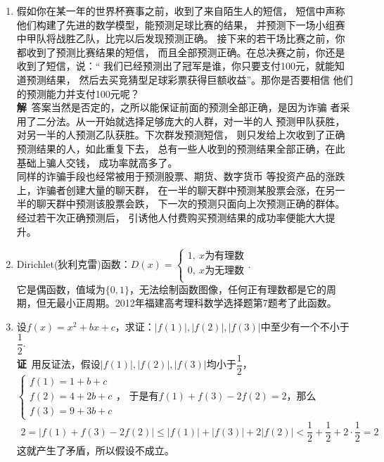\begin{enumerate}[label={【\textbf{例\thechapter.\arabic*}】},
 leftmargin=\inteval{\myenumleftmargin}pt,
 itemsep=\inteval{\myenumitempsep}pt,
 itemindent=\inteval{\myenumitemindent}pt]
 
\item \label{用二分法预测比赛结果进行诈骗}
假如你在某一年的世界杯赛事之前，收到了来自陌生人的短信，
短信中声称他们构建了先进的数学模型，能预测足球比赛的结果，
并预测下一场小组赛中甲队将战胜乙队，比完以后发现预测正确。
接下来的若干场比赛之前，你都收到了预测比赛结果的短信，
而且全部预测正确。在总决赛之前，你还是收到了短信，说：“
我们已经预测出了冠军是谁，你只要支付100元，就能知道预测结果，
然后去买竞猜型足球彩票获得巨额收益”。那你是否要相信
他们的预测能力并支付100元呢？ \\
\textbf{解}\ 答案当然是否定的，之所以能保证前面的预测全部正确，是因为诈骗
者采用了二分法。从一开始就选择足够庞大的人群，对一半的人
预测甲队获胜，对另一半的人预测乙队获胜。下次群发预测短信，
则只发给上次收到了正确预测结果的人，如此重复下去，
总有一些人收到的预测结果全部正确，在此基础上骗人交钱，
成功率就高多了。\\
同样的诈骗手段也经常被用于预测股票、期货、数字货币
等投资产品的涨跌上，诈骗者创建大量的聊天群，
在一半的聊天群中预测某股票会涨，在另一半的聊天群中预测该股票会跌，
下一次的预测只面向上次预测正确的群体。经过若干次正确预测后，
引诱他人付费购买预测结果的成功率便能大大提升。

\item Dirichlet(狄利克雷)函数：$ D(x)=
\begin{cases}
    1,\ x\text{为有理数} \\
    0,\ x\text{为无理数} \\
\end{cases} $. \\
它是偶函数，值域为$ \{0,1\} $，无法绘制函数图像，任何正有理数都是它的周期，但无最小正周期。2012年福建高考理科数学选择题第7题考了此函数。

\item 设$ f(x)=x^2+bx+c $，求证：$ |f(1)|,|f(2)|,|f(3)| $中至少有一个不小于
$ \dfrac{1}{2} $. \\
\textbf{证}\ 用反证法，假设$ |f(1)|,|f(2)|,|f(3)| $均小于$ \dfrac{1}{2} $，
$ \begin{cases}
 f(1)=1+b+c \\
 f(2)=4+2b+c \\
 f(3)=9+3b+c 
\end{cases} $，
于是有$ f(1)+f(3)-2f(2)=2 $，那么
\begin{gather*}
 2=|f(1)+f(3)-2f(2)|\leq |f(1)|+|f(3)|+2|f(2)|<
 \dfrac{1}{2}+\dfrac{1}{2}+2\cdot \dfrac{1}{2}=2
\end{gather*}
这就产生了矛盾，所以假设不成立。


\end{enumerate}
